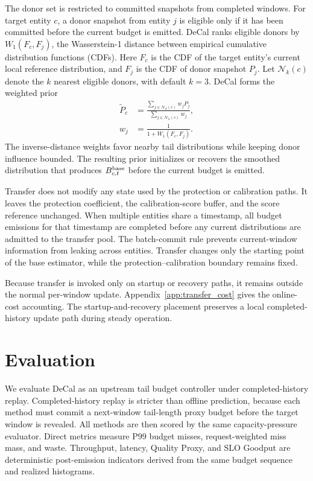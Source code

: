 \documentclass[sigplan,10pt, anonymous]{acmart}
\begin{document}
The donor set is restricted to committed snapshots from completed windows. For target entity $c$, a donor snapshot from entity $j$ is eligible only if it has been committed before the current budget is emitted. DeCal ranks eligible donors by $W_1(F_c,F_j)$, the Wasserstein-1 distance between empirical cumulative distribution functions (CDFs). Here $F_c$ is the CDF of the target entity's current local reference distribution, and $F_j$ is the CDF of donor snapshot $P_j$. Let $\mathcal{N}_k(c)$ denote the $k$ nearest eligible donors, with default $k=3$. DeCal forms the weighted prior
\begin{equation}
\label{eq:transfer_prior}
\begin{aligned}
\tilde{P}_{c}
&= \frac{\sum_{j\in\mathcal{N}_k(c)} w_j P_j}
 {\sum_{j\in\mathcal{N}_k(c)} w_j}, \\
w_j
&= \frac{1}{1+W_1(F_c,F_j)} .
\end{aligned}
\end{equation}
The inverse-distance weights favor nearby tail distributions while keeping donor influence bounded. The resulting prior initializes or recovers the smoothed distribution that produces $B_{c,t}^{\rm base}$ before the current budget is emitted.

Transfer does not modify any state used by the protection or calibration paths. It leaves the protection coefficient, the calibration-score buffer, and the score reference unchanged. When multiple entities share a timestamp, all budget emissions for that timestamp are completed before any current distributions are admitted to the transfer pool. The batch-commit rule prevents current-window information from leaking across entities. Transfer changes only the starting point of the base estimator, while the protection--calibration boundary remains fixed.

Because transfer is invoked only on startup or recovery paths, it remains outside the normal per-window update. Appendix~\ref{app:transfer_cost} gives the online-cost accounting. The startup-and-recovery placement preserves a local completed-history update path during steady operation.


\section{Evaluation}
\label{sec:evaluation}


We evaluate DeCal as an upstream tail budget controller under completed-history replay. Completed-history replay is stricter than offline prediction, because each method must commit a next-window tail-length proxy budget before the target window is revealed. All methods are then scored by the same capacity-pressure evaluator. Direct metrics measure P99 budget misses, request-weighted miss mass, and waste. Throughput, latency, Quality Proxy, and SLO Goodput are deterministic post-emission indicators derived from the same budget sequence and realized histograms. 
\end{document}
